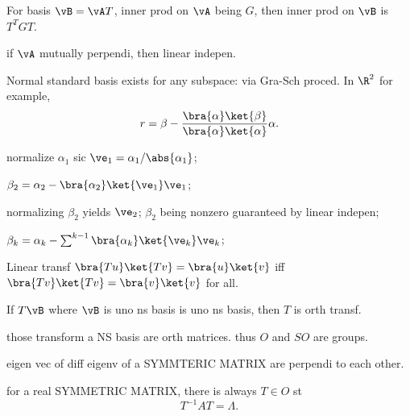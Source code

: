 \documentclass{ctexart}
\begin{document}
\begin{theorem}
	For basis $\vB = \vA T$, inner prod on $\vA$ being $G$, then inner prod on $\vB$ is $T^T GT$.
\end{theorem}
\begin{theorem}
	if $\vA$ mutually perpendi, then linear indepen.
\end{theorem}

\begin{theorem}[G-S proc]
	Normal standard basis exists for any subspace: via Gra-Sch proced. In $\R^2$ for example,
	\[ r = \beta - \frac{\bra{\alpha}\ket{\beta}}{\bra{\alpha}\ket{\alpha}}\alpha. \]
	\begin{cenum}
		\item normalize $\alpha_1$ sic $\ve_1 = \alpha_1/\abs{\alpha_1}$;
		\item $\beta_2 = \alpha_2 - \bra{\alpha_2}\ket{\ve_1} \ve_1$;
		\item normalizing $\beta_2$ yields $\ve_2$; $\beta_2$ being nonzero guaranteed by linear indepen;
		\item $\beta_k = \alpha_k - \sum^{k-1} \bra{\alpha_k}\ket{\ve_k}\ve_k$;
	\end{cenum}
\end{theorem}

\begin{theorem}
	Linear transf $\bra{Tu}\ket{Tv}=\bra{u}\ket{v}$ iff $\bra{Tv}\ket{Tv} = \bra{v}\ket{v}$ for all.
\end{theorem}
\begin{theorem}
	If $T\vB$ where $\vB$ is uno ns basis is uno ns basis, then $T$ is orth transf.
\end{theorem}

\begin{theorem}
	those transform a NS basis are orth matrices. thus $O$ and $SO$ are groups.
\end{theorem}

\begin{finale}
	eigen vec of diff eigenv of a SYMMTERIC MATRIX are perpendi to each other.
\end{finale}

\begin{finale}
	for a real SYMMETRIC MATRIX, there is always $T\in O$ st
	\[ T^{-1} AT = \Lambda. \]
\end{finale}
\end{document}
